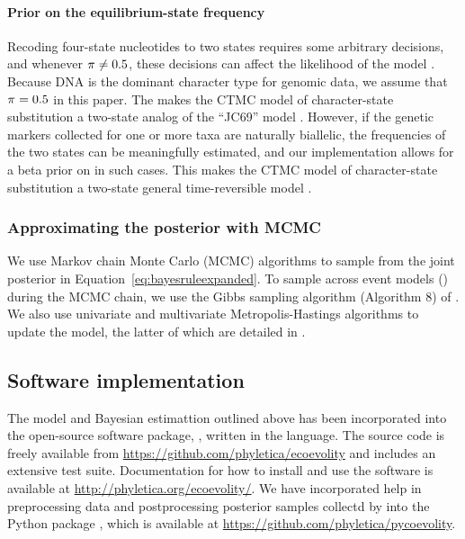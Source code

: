\begin{linenomath}
\paragraph{Prior on the equilibrium-state frequency}
Recoding four-state nucleotides to two states requires some arbitrary
decisions, and whenever $\pi_{} \neq 0.5$, these decisions can affect
the likelihood of the model \citep{Oaks2018ecoevolity}.
Because DNA is the dominant character type for genomic data, we assume that
$\pi_{} = 0.5$ in this paper.
The makes the CTMC model of character-state substitution a two-state analog of
the ``JC69'' model \citep{JC1969}.
However, if the genetic markers collected for one or more taxa are  naturally
biallelic, the frequencies of the two states can be meaningfully estimated, and
our implementation allows for a beta prior on \gfreq in such cases.
This makes the CTMC model of character-state substitution a two-state general
time-reversible model \citep{Tavare1986}.

\subsubsection{Approximating the posterior with MCMC}

We use Markov chain Monte Carlo (MCMC) algorithms to sample from the joint
posterior in Equation~\ref{eq:bayesruleexpanded}.
To sample across event models (\etimesets) during the MCMC chain, we use the
Gibbs sampling algorithm (Algorithm 8) of \citet{Neal2000}.
We also use univariate and multivariate Metropolis-Hastings algorithms
\citep{Metropolis1953,Hastings1970} to update the model,
the latter of which are detailed in \citet{Oaks2018ecoevolity}.

\subsection{Software implementation}
The model and Bayesian estimattion outlined above has been incorporated into
the open-source software package, \ecoevolity, written in the \cpp language.
The source code is freely available from
\url{https://github.com/phyletica/ecoevolity} and
includes an extensive test suite.
Documentation for how to install and use the software is available at
\url{http://phyletica.org/ecoevolity/}.
We have incorporated help in preprocessing data and postprocessing posterior
samples collectd by \ecoevolity into the Python package \pycoevolity, which is
available at
\url{https://github.com/phyletica/pycoevolity}.


\end{linenomath}
